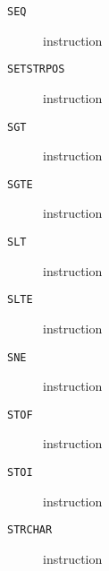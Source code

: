 \clearpage
\begin{description}
\item[\texttt{SEQ}] instruction\\

\end{description}
\clearpage
\begin{description}
\item[\texttt{SETSTRPOS}] instruction\\

\end{description}
\clearpage
\begin{description}
\item[\texttt{SGT}] instruction\\

\end{description}
\clearpage
\begin{description}
\item[\texttt{SGTE}] instruction\\

\end{description}
\clearpage
\begin{description}
\item[\texttt{SLT}] instruction\\

\end{description}
\clearpage
\begin{description}
\item[\texttt{SLTE}] instruction\\

\end{description}
\clearpage
\begin{description}
\item[\texttt{SNE}] instruction\\

\end{description}
\clearpage
\begin{description}
\item[\texttt{STOF}] instruction\\

\end{description}
\clearpage
\begin{description}
\item[\texttt{STOI}] instruction\\

\end{description}
\clearpage
\begin{description}
\item[\texttt{STRCHAR}] instruction\\

\end{description}
